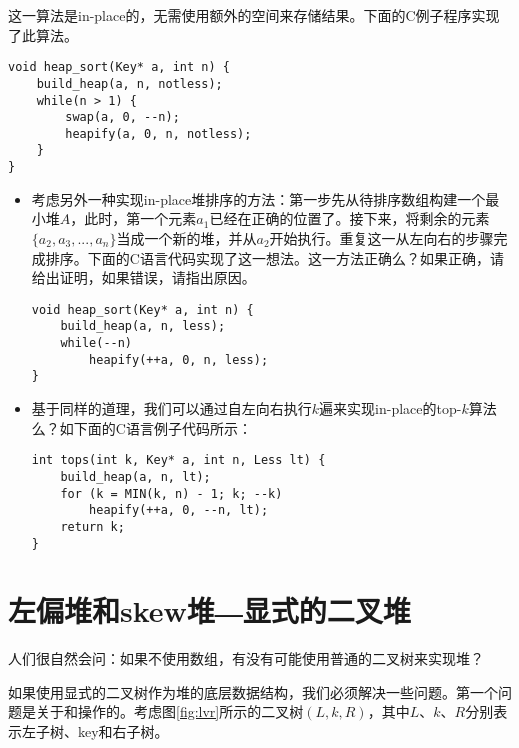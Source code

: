 \documentclass[UTF8]{article}
\begin{document}
这一算法是in-place的，无需使用额外的空间来存储结果。下面的C例子程序实现了此算法。

\lstset{language=C}
\begin{lstlisting}
void heap_sort(Key* a, int n) {
    build_heap(a, n, notless);
    while(n > 1) {
        swap(a, 0, --n);
        heapify(a, 0, n, notless);
    }
}
\end{lstlisting}

\begin{Exercise}
\begin{itemize}
\item 考虑另外一种实现in-place堆排序的方法：第一步先从待排序数组构建一个最小堆$A$，此时，第一个元素$a_1$已经在正确的位置了。接下来，将剩余的元素$\{a_2, a_3, ..., a_n\}$当成一个新的堆，并从$a_2$开始执行。重复这一从左向右的步骤完成排序。下面的C语言代码实现了这一想法。这一方法正确么？如果正确，请给出证明，如果错误，请指出原因。
\lstset{language=C}
\begin{lstlisting}
void heap_sort(Key* a, int n) {
    build_heap(a, n, less);
    while(--n)
        heapify(++a, 0, n, less);
}
\end{lstlisting}

\item 基于同样的道理，我们可以通过自左向右执行$k$遍来实现in-place的top-$k$算法么？如下面的C语言例子代码所示：
\lstset{language=C}
\begin{lstlisting}
int tops(int k, Key* a, int n, Less lt) {
    build_heap(a, n, lt);
    for (k = MIN(k, n) - 1; k; --k)
        heapify(++a, 0, --n, lt);
    return k;
}
\end{lstlisting}
\end{itemize}
\end{Exercise}

\section{左偏堆和skew堆―显式的二叉堆}
\label{ebheap}

人们很自然会问：如果不使用数组，有没有可能使用普通的二叉树来实现堆？

如果使用显式的二叉树作为堆的底层数据结构，我们必须解决一些问题。第一个问题是关于和操作的。考虑图\ref{fig:lvr}所示的二叉树$(L, k, R)$，其中$L$、$k$、$R$分别表示左子树、key和右子树。
\end{document}
